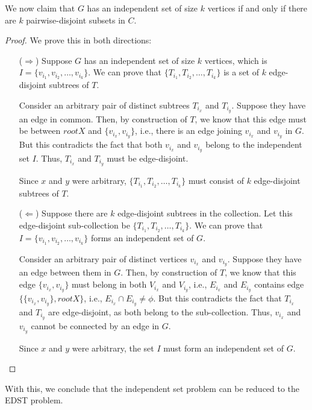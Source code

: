 \documentclass[11pt, fleqn]{article}
\begin{document}
\begin{itemize}
    We now claim that $G$ has an independent set of size $k$ vertices if and only if there are $k$ pairwise-disjoint subsets in $C$.
    \begin{proof}
        We prove this in both directions:
        \begin{itemize}
            \item[($\Rightarrow$)]
            Suppose $G$ has an independent set of size $k$ vertices, which is $I = \{v_{i_1}, v_{i_2}, \dots, v_{i_k}\}$. We can prove that $\{T_{i_1}, T_{i_2}, \dots, T_{i_k}\}$ is a set of $k$ edge-disjoint subtrees of $T$.
            
            Consider an arbitrary pair of distinct subtrees $T_{i_x}$ and $T_{i_y}$. Suppose they have an edge in common. Then, by construction of $T$, we know that this edge must be between $root X$ and $\{v_{i_x}, v_{i_y}\}$, i.e., there is an edge joining $v_{i_x}$ and $v_{i_y}$ in $G$. But this contradicts the fact that both $v_{i_x}$ and $v_{i_y}$ belong to the independent set $I$. Thus, $T_{i_x}$ and $T_{i_y}$ must be edge-disjoint.
            
            Since $x$ and $y$ were arbitrary, $\{T_{i_1}, T_{i_2}, \dots, T_{i_k}\}$ must consist of $k$ edge-disjoint subtrees of $T$.
            \item[($\Leftarrow$)]
            Suppose there are $k$ edge-disjoint subtrees in the collection. Let this edge-disjoint sub-collection be $\{T_{i_1}, T_{i_2}, \dots, T_{i_k}\}$. We can prove that $I = \{v_{i_1}, v_{i_2}, \dots, v_{i_k}\}$ forms an independent set of $G$.
            
            Consider an arbitrary pair of distinct vertices $v_{i_x}$ and $v_{i_y}$. Suppose they have an edge between them in $G$. Then, by construction of $T$, we know that this edge $\{v_{i_x}, v_{i_y}\}$ must belong in both $V_{i_x}$ and $V_{i_y}$, i.e., $E_{i_x}$ and $E_{i_y}$ contains edge $\{\{v_{i_x}, v_{i_y}\}, root X\}$, i.e., $E_{i_x} \cap E_{i_y} \neq \phi$. But this contradicts the fact that $T_{i_x}$ and $T_{i_y}$ are edge-disjoint, as both belong to the sub-collection. Thus, $v_{i_x}$ and $v_{i_y}$ cannot be connected by an edge in $G$.
            
            Since $x$ and $y$ were arbitrary, the set $I$ must form an independent set of $G$.
        \end{itemize}
    \end{proof}
    With this, we conclude that the independent set problem can be reduced to the EDST problem.
    

\end{itemize}
\end{document}
